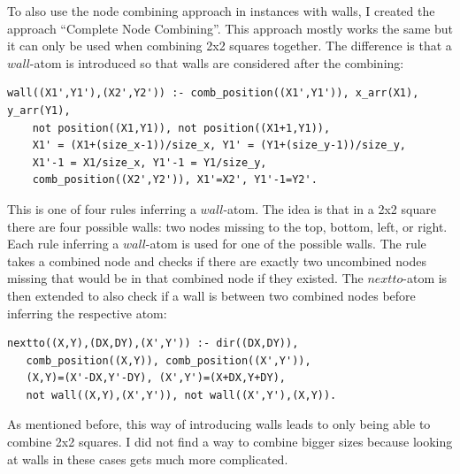 \documentclass[runningheads]{llncs}
\begin{document}
To also use the node combining approach in instances with walls, I created the approach ``Complete Node Combining''. This approach mostly works the same but it can only be used when combining 2x2 squares together. The difference is that a $wall$-atom is introduced so that walls are considered after the combining:
\begin{verbatim}
wall((X1',Y1'),(X2',Y2')) :- comb_position((X1',Y1')), x_arr(X1), y_arr(Y1),
    not position((X1,Y1)), not position((X1+1,Y1)),
    X1' = (X1+(size_x-1))/size_x, Y1' = (Y1+(size_y-1))/size_y,
    X1'-1 = X1/size_x, Y1'-1 = Y1/size_y,
    comb_position((X2',Y2')), X1'=X2', Y1'-1=Y2'.
\end{verbatim}
This is one of four rules inferring a $wall$-atom. The idea is that in a 2x2 square there are four possible walls: two nodes missing to the top, bottom, left, or right. Each rule inferring a $wall$-atom is used for one of the possible walls. The rule takes a combined node and checks if there are exactly two uncombined nodes missing that would be in that combined node if they existed. The $nextto$-atom is then extended to also check if a wall is between two combined nodes before inferring the respective atom:
\begin{verbatim}
nextto((X,Y),(DX,DY),(X',Y')) :- dir((DX,DY)),
   comb_position((X,Y)), comb_position((X',Y')),
   (X,Y)=(X'-DX,Y'-DY), (X',Y')=(X+DX,Y+DY),
   not wall((X,Y),(X',Y')), not wall((X',Y'),(X,Y)).
\end{verbatim}
As mentioned before, this way of introducing walls leads to only being able to combine 2x2 squares. I did not find a way to combine bigger sizes because looking at walls in these cases gets much more complicated. \\
\end{document}
